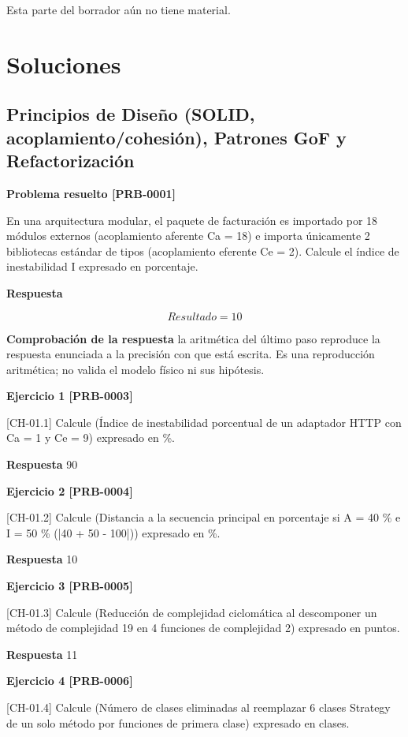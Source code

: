 \documentclass{book}
\begin{document}
\noindent Esta parte del borrador aún no tiene material.
\chapter{Soluciones}

\section{Principios de Diseño (SOLID, acoplamiento/cohesión), Patrones GoF y Refactorización}

\noindent\textbf{Problema resuelto [PRB-0001]}

En una arquitectura modular, el paquete de facturación es importado por 18 módulos externos (acoplamiento aferente Ca = 18) e importa únicamente 2 bibliotecas estándar de tipos (acoplamiento eferente Ce = 2). Calcule el índice de inestabilidad I expresado en porcentaje.

\noindent\textbf{Respuesta}

\[
Resultado = 10
\]

\noindent\textbf{Comprobación de la respuesta} la aritmética del último paso reproduce la respuesta enunciada a la precisión con que está escrita. Es una reproducción aritmética; no valida el modelo físico ni sus hipótesis.

\noindent\textbf{Ejercicio 1 [PRB-0003]}

[CH-01.1] Calcule (Índice de inestabilidad porcentual de un adaptador HTTP con Ca = 1 y Ce = 9) expresado en \%.

\noindent\textbf{Respuesta} 90

\noindent\textbf{Ejercicio 2 [PRB-0004]}

[CH-01.2] Calcule (Distancia a la secuencia principal en porcentaje si A = 40 \% e I = 50 \% (|40 + 50 - 100|)) expresado en \%.

\noindent\textbf{Respuesta} 10

\noindent\textbf{Ejercicio 3 [PRB-0005]}

[CH-01.3] Calcule (Reducción de complejidad ciclomática al descomponer un método de complejidad 19 en 4 funciones de complejidad 2) expresado en puntos.

\noindent\textbf{Respuesta} 11

\noindent\textbf{Ejercicio 4 [PRB-0006]}

[CH-01.4] Calcule (Número de clases eliminadas al reemplazar 6 clases Strategy de un solo método por funciones de primera clase) expresado en clases.
\end{document}
